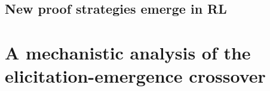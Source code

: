 \documentclass{article}
\begin{document}
\subsection{New proof strategies emerge in RL}
\subsection{}
\section{A mechanistic analysis of the elicitation-emergence crossover}

\printbibliography[title={References}]




\appendix



\newpage

\end{document}
